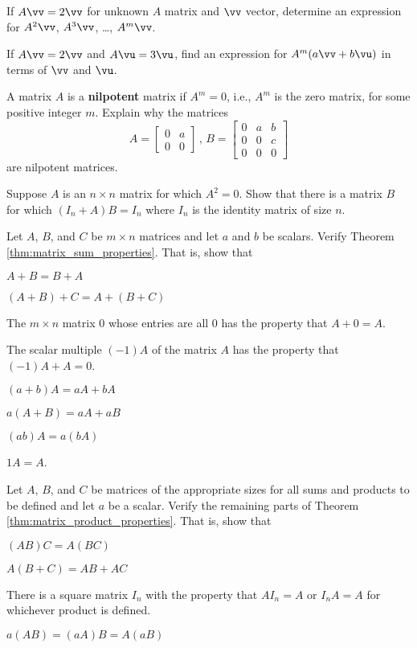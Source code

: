 \item If $A\vv=2\vv$ for unknown $A$ matrix and $\vv$ vector, determine an expression for $A^2 \vv$, $A^3\vv$, \ldots, $A^m\vv$.

\item If $A\vv=2\vv$ and $A\vu=3\vu$, find an expression for $A^m(a\vv+b\vu)$ in terms of $\vv$ and $\vu$.

\item A matrix $A$ is a \textbf{nilpotent} matrix if $A^m=0$, i.e., $A^m$ is the zero matrix, for some positive integer $m$. Explain why the matrices  
\[ A = \left[ \begin{array}{cc} 0 & a \\ 0 & 0 \end{array} \right] \, , \, B = \left[ \begin{array}{ccc} 0 & a & b \\ 0 & 0& c\\ 0&0&0 \end{array} \right] \]
are nilpotent matrices.

\item Suppose $A$ is an $n\times n$ matrix for which $A^2=0$. Show that there is a matrix $B$ for which $(I_n+A)B=I_n$ where $I_n$ is the identity matrix of size $n$.

\item Let $A$, $B$, and $C$ be $m \times n$ matrices and let $a$ and $b$ be scalars. Verify Theorem \ref{thm:matrix_sum_properties}. That is, show that 
	\ba
	\item $A+B = B+A$ 
	\item $(A+B) + C = A + (B+C)$ 
	\item The $m \times n$ matrix $0$ whose entries are all 0 has the property that $A + 0 = A$. 
	\item  The scalar multiple $(-1)A$ of the matrix $A$ has the property that $(-1)A + A = 0$. 
	\item $(a+b) A = aA + bA$ 
	\item $a(A+B) = aA + aB$ 
	\item $(ab) A = a(bA)$
	\item $1A=A$.
	\ea

\item Let $A$, $B$, and $C$ be matrices of the appropriate sizes for all sums and products to be defined and let $a$ be a scalar. Verify the remaining parts of Theorem \ref{thm:matrix_product_properties}. That is, show that 
	\ba
	\item $(AB)C = A(BC)$ 
	\item $A(B+C) = AB + AC$ 
	\item There is a square matrix $I_n$ with the property that $AI_n = A$ or $I_nA = A$ for whichever product is defined. 
	\item $a(AB) = (aA)B = A(aB)$
	\ea

